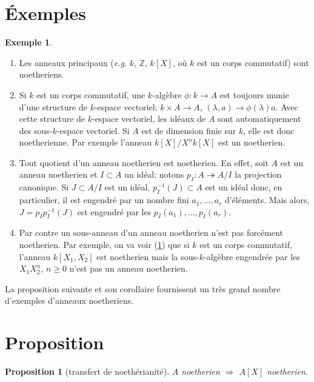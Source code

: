 \documentclass[a4paper, oneside, 12pt]{book}
\theoremstyle{theoremeStyle} %
\newtheorem{proposition}[theoreme]{Proposition}
\theoremstyle{definition} %
\newtheorem{exemple}[theoreme]{Exemple}
\newcommand{\Z}{\mathbb{Z}}
\begin{document}
\section{Éxemples}
\begin{exemple}\label{NoethEx}
  \begin{enumerate}[leftmargin=* ,parsep=0cm,itemsep=0cm,topsep=0cm]
  \item  Les anneaux principaux (\textit{e.g.} $k$, $\Z$, $k[X]$, où $k$ est un corps commutatif) sont noetheriens. 
  \item  Si $k$ est un corps commutatif, une  $k$-algèbre $\phi:k\rightarrow A$ est toujours munie d'une structure de $k$-espace vectoriel: $k\times A\rightarrow A$, $(\lambda,a)\rightarrow \phi(\lambda)a$. Avec cette structure de $k$-espace vectoriel, les idéaux de $A$ sont automatiquement des sous-$k$-espace vectoriel. Si $A$ est de dimension finie sur $k$, elle est donc noetherienne. Par exemple l'anneau $k[X]/X^nk[X]$ est un  noetherien. 
  \item  Tout quotient d'un anneau noetherien est noetherien. En effet, soit $A$ est un anneau noetherien et $I\subset A$  un idéal; notons $p_I:A\twoheadrightarrow A/I$ la projection canonique. Si $J\subset A/I$ est un idéal, $p_I^{-1}(J)\subset A$ est un idéal donc, en particulier, il est engendré par un nombre fini $a_1,\dots, a_r$ d'éléments. Mais alors, $J=p_Ip_I^{-1}(J)$ est engendré par les  $p_I(a_1),\dots, p_I(a_r)$.
  \item Par contre un sous-anneau d'un anneau noetherien n'est pas forcément noetherien. Par exemple, on va voir (\ref{NoethTransfert}) que si $k$ est un corps commutatif, l'anneau $k[X_1,X_2]$ est noetherien mais la sous-$k$-algèbre engendrée par les $  X_1X_2^n$, $n\geq 0$ n'est pas un anneau noetherien.\\
  \end{enumerate}
\end{exemple}

La proposition suivante et son corollaire fournissent un très grand nombre d'exemples d'anneaux noetheriens.   
    
\section{Proposition}
\begin{proposition}[transfert de noethérianité]\label{NoethTransfert}
  $A$ noetherien $\Rightarrow$ $A[X]$ noetherien.
\end{proposition}
\end{document}
